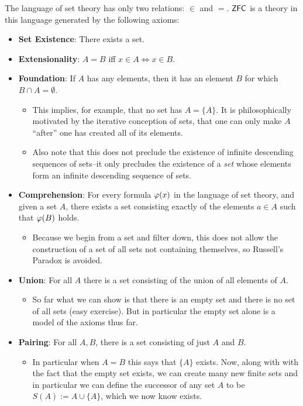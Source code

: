 \documentclass{amsart}
\DeclareMathOperator{\ZFC}{\sf{ZFC}}
\begin{document}
	The language of set theory has only two relations: $\in$ and $=$. $\ZFC$ is a theory in this language generated by the following axioms:
	\begin{itemize}
		\item \textbf{Set Existence}: There exists a set.
		\item \textbf{Extensionality}: $A=B$ iff $x\in A \iff x\in B$.
		\item \textbf{Foundation}: If $A$ has any elements, then it has an element $B$ for which $B\cap A = \emptyset$.
		\begin{itemize}
			\item This implies, for example, that no set has $A=\{A\}$. It is philosophically motivated by the iterative conception of sets, that one can only make $A$ ``after'' one has created all of its elements.
			\item Also note that this does not preclude the existence of infinite descending sequences of sets--it only precludes the existence of a \textit{set} whose elements form an infinite descending sequence of sets.
		\end{itemize}
		\item \textbf{Comprehension}: For every formula $\varphi(x)$ in the language of set theory, and given a set $A$, there exists a set consisting exactly of the elements $a\in A$ such that $\varphi(B)$ holds.
		\begin{itemize}
			\item Because we begin from a set and filter down, this does not allow the construction of a set of all sets not containing themselves, so Russell's Paradox is avoided.
		\end{itemize}
		\item \textbf{Union}: For all $A$ there is a set consisting of the union of all elements of $A$. 
		\begin{itemize}
			\item So far what we can show is that there is an empty set and there is no set of all sets (easy exercise). But in particular the empty set alone is a model of the axioms thus far.
		\end{itemize}
		\item \textbf{Pairing}: For all $A,B$, there is a set consisting of just $A$ and $B$.
		\begin{itemize}
			\item In particular when $A=B$ this says that $\{A\}$ exists. Now, along with with the fact that the empty set exists, we can create many new finite sets and in particular we can define the successor of any set $A$ to be $S(A):=A\cup \{A\}$, which we now know exists.

\end{itemize}
\end{itemize}
\end{document}
